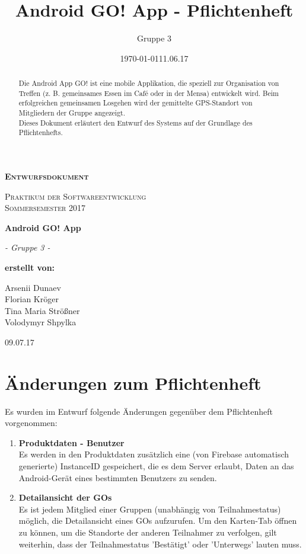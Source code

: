 \documentclass[11pt,a4paper]{report}
\date{\today}
\title{Android GO! App - Pflichtenheft}
\author{Gruppe 3}
\date{11.06.17}
\begin{document}
\begin{titlepage}
	\begin{center}
	{\scshape\LARGE \bfseries Entwurfsdokument \par}
	\vspace{1cm}
	{\scshape\Large Praktikum der Softwareentwicklung \\ Sommersemester 2017\par}
	\vspace{1.5cm}
	{\huge\bfseries Android GO! App\par}
	\vspace{2cm}
	{\Large\itshape - Gruppe 3 -\par}
	\vfill
	{\bfseries erstellt von:\par}
	Arsenii Dunaev \\
	Florian Kröger \\
	Tina Maria Strößner \\
	Volodymyr Shpylka \\	
	\vfill
	{\large 09.07.17 \par}	
	\end{center}
\end{titlepage}

\begin{abstract}
Die Android App GO! ist eine mobile Applikation, die speziell zur Organisation von Treffen (z. B. gemeinsames Essen im Café oder in der Mensa) entwickelt wird. Beim erfolgreichen gemeinsamen Losgehen wird der gemittelte GPS-Standort von Mitgliedern der Gruppe angezeigt.\\

Dieses Dokument erläutert den Entwurf des Systems auf der Grundlage des Pflichtenhefts.
\end{abstract}

\sloppy
{}
\tableofcontents




\section{Änderungen zum Pflichtenheft}

Es wurden im Entwurf folgende Änderungen gegenüber dem Pflichtenheft vorgenommen:
\begin{enumerate}
	\item \textbf{Produktdaten - Benutzer} \\
	Es werden in den Produktdaten zusätzlich eine (von Firebase automatisch generierte) InstanceID gespeichert, die es dem Server erlaubt, Daten an das Android-Gerät eines bestimmten Benutzers zu senden.
	\item \textbf{Detailansicht der GOs} \\
	Es ist jedem Mitglied einer Gruppen (unabhängig von Teilnahmestatus) möglich, die Detailansicht eines GOs aufzurufen. Um den Karten-Tab öffnen zu können, um die Standorte der anderen Teilnahmer zu verfolgen, gilt weiterhin, dass der Teilnahmestatus 'Bestätigt' oder 'Unterwegs' lauten muss.
\end{enumerate}
\end{document}
